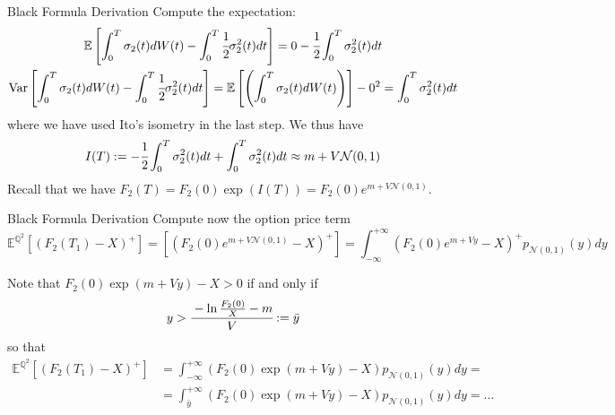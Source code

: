 \documentclass{beamer}
\begin{document}
\begin{frame}{Black Formula Derivation}
Compute the expectation:
\begin{equation*}
\begin{gathered}
\mathbb{E}\left[\int_0^T \sigma_2(t)dW(t) - \int_0^T  \cfrac{1}{2}\sigma^2_2(t)dt\right] = 0 - \cfrac{1}{2}\int_0^T \sigma^2_2(t)dt \\
\text{Var}\left[\int_0^T \sigma_2(t)dW(t) - \int_0^T  \cfrac{1}{2}\sigma^2_2(t)dt\right] = \mathbb{E}\left[\left(\int_0^T \sigma_2(t)dW(t) \right)\right] - 0^2 = \int_0^T \sigma^2_2(t)dt
\end{gathered}
\end{equation*}
where we have used Ito’s isometry in the last step. We thus have
\begin{equation*}
I(T) := - \cfrac{1}{2}\int_0^T \sigma^2_2(t)dt + \int_0^T \sigma^2_2(t)dt \approx m + V\mathcal{N}(0,1)
\end{equation*}
Recall that we have $F_2(T) = F_2(0) \exp(I(T)) = F_2(0)e^{m+V \mathcal{N}(0,1)}$.
\end{frame}

\begin{frame}{Black Formula Derivation}
Compute now the option price term
\begin{equation*}
\mathbb{E}^{\mathbb{Q}^2}[(F_2(T_1) - X)^+] = [(F_2(0)e^{m+V \mathcal{N}(0,1)} - X)^+] =\int_{-\infty}^{+\infty}
(F_2(0)e^{m+Vy}-X)^+p_{\mathcal{N}(0,1)}(y)dy
\end{equation*} 

Note that $F_2(0) \exp(m + Vy) - X > 0$ if and only if
\begin{equation*}
y > \cfrac{-\ln\frac{F_2(0)}{X}-m}{V} := \bar{y}
\end{equation*}
so that
\begin{equation*}
\begin{aligned}
\mathbb{E}^{\mathbb{Q}^2}[(F_2(T_1) - X)^+] &=\int_{-\infty}^{+\infty}(F_2(0)\exp(m+Vy)-X)p_{\mathcal{N}(0,1)}(y)dy= \\
&=\int_{\bar{y}}^{+\infty}(F_2(0)\exp(m+Vy)-X)p_{\mathcal{N}(0,1)}(y)dy =\ldots
\end{aligned}
\end{equation*}
\end{frame}
\end{document}
